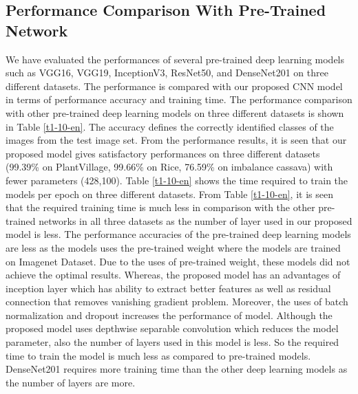 \subsection{Performance Comparison With Pre-Trained Network}
We have evaluated the performances of several pre-trained deep learning models such as VGG16, VGG19, InceptionV3, ResNet50, and DenseNet201 on three different datasets. The performance is compared with our proposed CNN model in terms of performance accuracy and training time. The performance comparison with other pre-trained deep learning models on three different datasets is shown in Table \ref{t1-10-en}. The accuracy defines the correctly identified classes of the images from the test image set. From the performance results, it is seen that our proposed model gives satisfactory performances on three different datasets (99.39\% on PlantVillage, 99.66\% on Rice, 76.59\% on imbalance cassava) with fewer parameters (428,100). Table \ref{t1-10-en} shows the time required to train the models per epoch on three different datasets. From Table \ref{t1-10-en}, it is seen that the required training time is much less in comparison with the other pre-trained networks in all three datasets as the number of layer used in our proposed model is less. The performance accuracies of the pre-trained deep learning models are less as the models uses the pre-trained weight where the models are trained on Imagenet Dataset. Due to the uses of pre-trained weight, these models did not achieve the optimal results. Whereas, the proposed model has an advantages of inception layer which has ability to extract better features as well as residual connection that removes vanishing gradient problem. Moreover, the uses of batch normalization and dropout increases the performance of model. Although the proposed model uses depthwise separable convolution which reduces the model parameter, also the number of layers used in this model is less. So the required time to train the model is much less as compared to pre-trained models. DenseNet201 requires more training time than the other deep learning models as the number of layers are more.


